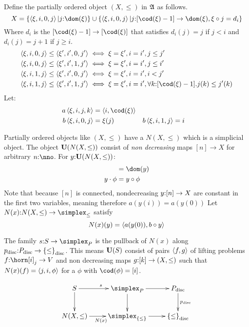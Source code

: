 \documentclass[csh.tex]{subfiles}
\begin{document}
\begin{definition}
Define the partially ordered object $(X,\leq)$ in $\mathfrak A$ as follows.
\[X = \set{\tuplet{\xi,i,0,j}|j\of\dom(\xi)}\cup
\set{\tuplet{\xi,i,0,j}|j\of[\cod(\xi)-1]\to \dom(\xi),\xi\circ j = d_i}\]
Where $d_i$ is the  $[\cod(\xi)-1]\to[\cod(\xi)]$ that satisfies $d_i(j) = j$ if $j<i$ and $d_i(j) = j+1$ if $j\geq i$.
\begin{align*}
\tuplet{\xi,i,0,j}\leq\tuplet{\xi',i',0,j'} &\iff \xi=\xi',i=i',j\leq j'\\
\tuplet{\xi,i,0,j}\leq\tuplet{\xi',i',1,j'} &\iff \xi=\xi',i=i',j \leq i'\\ 
\tuplet{\xi,i,1,j}\leq\tuplet{\xi',i',0,j'} &\iff \xi=\xi',i=i',i < j'\\ 
\tuplet{\xi,i,1,j}\leq\tuplet{\xi',i',1,j'} &\iff \xi=\xi',i=i',
\forall k\of[\cod(\xi)-1].j(k)\leq j'(k)\\  
\end{align*}
Let:
\begin{align*}
a\tuplet{\xi,i,j,k} &= \tuplet{i,\cod(\xi)}\\
b\tuplet{\xi,i,0,j} &= \xi(j)& 
b\tuplet{\xi,i,1,j} &= i\\
\end{align*}

Partially ordered objects like $(X,\leq)$ have a  $N(X,\leq)$ which is a simplicial object. The object $\mathbf{U}(N(X,\leq))$ consist of \emph{non decreasing} maps $[n]\to X$ for arbitrary $n\of\nno$. 
For $y\mathord : \mathbf{U}(N(X,\leq))$:
\begin{align*}
[\dim(y)] &= \dom(y)\\
y\cdot \phi &= y\circ \phi\\
\end{align*}
Note that because $[n]$ is connected, nondecreasing $y\mathord :[n]\to X$ are constant in the first two variables, meaning therefore $a(y(i)) = a(y(0))$ Let $N(x)\of N(X,\leq)\to \simplex_\leq$ satisfy 
\[ N(x)(y) = \left\langle a(y(0)),b\circ y \right\rangle \]

The family $s\of S\to \simplex_P$ is the pullback of $N(x)$ along $p_{\rm disc}\mathord : P_{\rm disc}\to\left\{\leq\right\}_{\rm disc}$. 
This means $\mathbf{U}(S)$ consist of pairs $\left\langle f,g \right\rangle$ of lifting problems $f\of \horn[i]_j\to V$ and non decreasing maps $g\mathord : [k] \to (X,\leq)$ such that $N(x)(f)= \left\langle j,i,\phi \right\rangle$ for a $\phi$ with $\cod(\phi)=[i]$.

\[\xymatrix{
S\ar[d]\ar[r]^s& \simplex_P \ar[d]\ar[r] &P\disc\ar[d]^{p\disc}\\
N(X,\leq)\ar[r]_{N(x)}&\simplex_{\set\leq}\ar[r] & \set\leq\disc
}\]
\end{definition}
\end{document}
